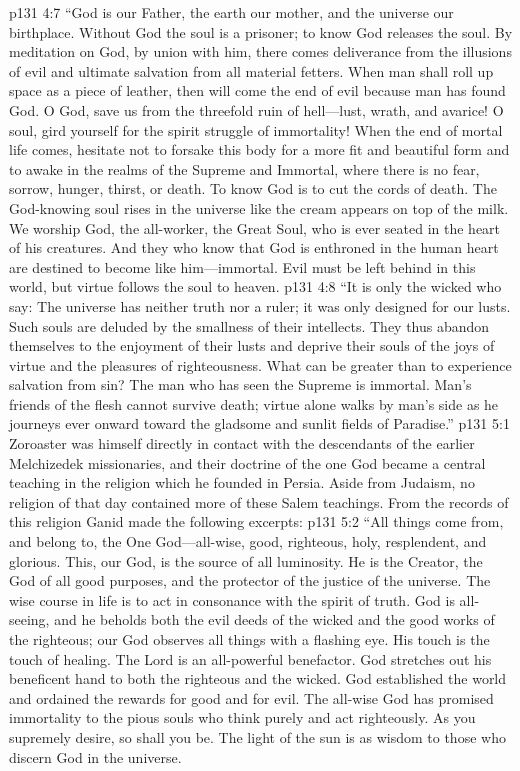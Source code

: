 \vs p131 4:7 “God is our Father, the earth our mother, and the universe our birthplace. Without God the soul is a prisoner; to know God releases the soul. By meditation on God, by union with him, there comes deliverance from the illusions of evil and ultimate salvation from all material fetters. When man shall roll up space as a piece of leather, then will come the end of evil because man has found God. O God, save us from the threefold ruin of hell---lust, wrath, and avarice! O soul, gird yourself for the spirit struggle of immortality! When the end of mortal life comes, hesitate not to forsake this body for a more fit and beautiful form and to awake in the realms of the Supreme and Immortal, where there is no fear, sorrow, hunger, thirst, or death. To know God is to cut the cords of death. The God\hyp{}knowing soul rises in the universe like the cream appears on top of the milk. We worship God, the all\hyp{}worker, the Great Soul, who is ever seated in the heart of his creatures. And they who know that God is enthroned in the human heart are destined to become like him---immortal. Evil must be left behind in this world, but virtue follows the soul to heaven.
\vs p131 4:8 “It is only the wicked who say: The universe has neither truth nor a ruler; it was only designed for our lusts. Such souls are deluded by the smallness of their intellects. They thus abandon themselves to the enjoyment of their lusts and deprive their souls of the joys of virtue and the pleasures of righteousness. What can be greater than to experience salvation from sin? The man who has seen the Supreme is immortal. Man’s friends of the flesh cannot survive death; virtue alone walks by man’s side as he journeys ever onward toward the gladsome and sunlit fields of Paradise.”
\vs p131 5:1 Zoroaster was himself directly in contact with the descendants of the earlier Melchizedek missionaries, and their doctrine of the one God became a central teaching in the religion which he founded in Persia. Aside from Judaism, no religion of that day contained more of these Salem teachings. From the records of this religion Ganid made the following excerpts:
\pc \vs p131 5:2 “All things come from, and belong to, the One God---all\hyp{}wise, good, righteous, holy, resplendent, and glorious. This, our God, is the source of all luminosity. He is the Creator, the God of all good purposes, and the protector of the justice of the universe. The wise course in life is to act in consonance with the spirit of truth. God is all\hyp{}seeing, and he beholds both the evil deeds of the wicked and the good works of the righteous; our God observes all things with a flashing eye. His touch is the touch of healing. The Lord is an all\hyp{}powerful benefactor. God stretches out his beneficent hand to both the righteous and the wicked. God established the world and ordained the rewards for good and for evil. The all\hyp{}wise God has promised immortality to the pious souls who think purely and act righteously. As you supremely desire, so shall you be. The light of the sun is as wisdom to those who discern God in the universe.
